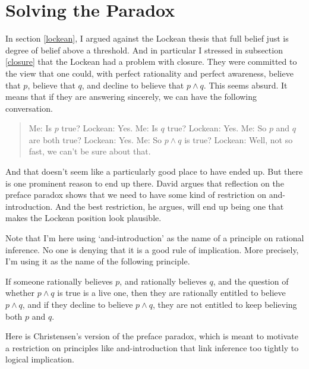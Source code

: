 \documentclass[11pt,]{book}
\providecommand{\tightlist}{%
  \setlength{\itemsep}{0pt}\setlength{\parskip}{0pt}}
\begin{document}
\hypertarget{solving-the-paradox}{%
\section{Solving the Paradox}\label{solving-the-paradox}}

In section \ref{lockean}, I argued against the Lockean thesis that full belief just is degree of belief above a threshold. And in particular I stressed in subsection \ref{closure} that the Lockean had a problem with closure. They were committed to the view that one could, with perfect rationality and perfect awareness, believe that \(p\), believe that \(q\), and decline to believe that \(p \wedge q\). This seems absurd. It means that if they are answering sincerely, we can have the following conversation.

\begin{quote}
Me: Is \(p\) true?
Lockean: Yes.
Me: Is \(q\) true?
Lockean: Yes.
Me: So \(p\) and \(q\) are both true?
Lockean: Yes.
Me: So \(p \wedge q\) is true?
Lockean: Well, not so fast, we can't be sure about that.
\end{quote}

And that doesn't seem like a particularly good place to have ended up. But there is one prominent reason to end up there. David \citet{Christensen2005} argues that reflection on the preface paradox shows that we need to have some kind of restriction on and-introduction. And the best restriction, he argues, will end up being one that makes the Lockean position look plausible.

Note that I'm here using `and-introduction' as the name of a principle on rational inference. No one is denying that it is a good rule of implication. More precisely, I'm using it as the name of the following principle.

\begin{description}
\tightlist
\item[And-introduction]
If someone rationally believes \(p\), and rationally believes \(q\), and the question of whether \(p \wedge q\) is true is a live one, then they are rationally entitled to believe \(p \wedge q\), and if they decline to believe \(p \wedge q\), they are not entitled to keep believing both \(p\) and \(q\).
\end{description}

Here is Christensen's version of the preface paradox, which is meant to motivate a restriction on principles like and-introduction that link inference too tightly to logical implication.
\end{document}
